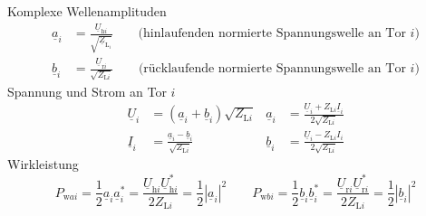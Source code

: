 \documentclass[10pt,a4paper,fleqn,landscape]{article}
\renewcommand{\c}[1]{\underline{#1}}			%
\begin{document}
\begin{multicols}{2}
Komplexe Wellenamplituden
	\begin{align*}
		\c{a}_i&=\frac{\c{U}_{\text{h}i}}{\sqrt{\c{Z}_{\text{L}_i}}} \qquad \text{(hinlaufenden normierte Spannungswelle an Tor $i$)}\\
		\c{b}_i&=\frac{\c{U}_{\text{r}i}}{\sqrt{Z_{\text{L}i}}} \qquad \text{(rücklaufende normierte Spannungswelle an Tor $i$)}
	\end{align*}
Spannung und Strom an Tor $i$
	\begin{align*}
		\c{U}_i&=(\c{a}_i+\c{b}_i)\sqrt{Z_{\text{L}i}} & \c{a}_i&=\frac{\c{U}_i+Z_{\text{L}i}\c{I}_i}{2\sqrt{Z_{\text{L}i}}} \\
		\c{I}_i&=\frac{\c{a}_i-\c{b}_i}{\sqrt{Z_{\text{L}i}}} & \c{b}_i&=\frac{\c{U}_i-Z_{\text{L}i}I_i}{2\sqrt{Z_{\text{L}i}}}
	\end{align*}
Wirkleistung
	\begin{equation*}
		P_{\text{w}ai}=\frac{1}{2}\c{a}_i\c{a}_i^*=\frac{\c{U}_{\text{h}i}\c{U}_{\text{h}i}^*}{2Z_{\text{L}i}}=\frac{1}{2}|\c{a}_i|^2 \qquad P_{\text{w}bi}=\frac{1}{2}\c{b}_i\c{b}_i^*=\frac{\c{U}_{\text{r}i}\c{U}_{\text{r}i}^*}{2Z_{\text{L}i}}=\frac{1}{2}|\c{b}_i|^2
	\end{equation*}

\end{multicols}
\end{document}
